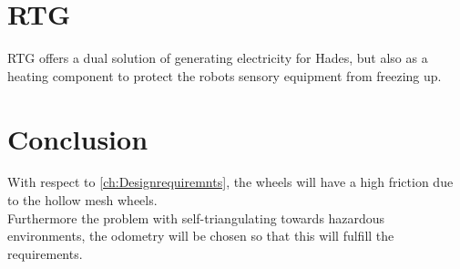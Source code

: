 \section{RTG}
RTG offers a dual solution of generating electricity for Hades, but also as a heating component to protect the robots sensory equipment from freezing up.

\section{Conclusion}

With respect to \ref{ch:Designrequiremnts}, the wheels will have a high friction due to the hollow mesh wheels.\\
Furthermore the problem with self-triangulating towards hazardous environments, the odometry will be chosen so that this will fulfill the requirements.\\
